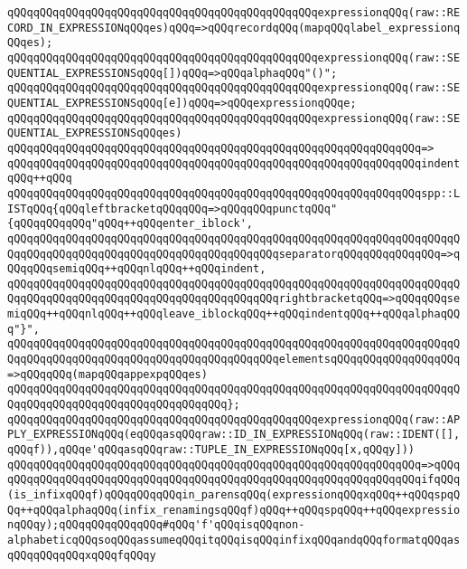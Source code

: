 \verb|qQQqqQQqqQQqqQQqqQQqqQQqqQQqqQQqqQQqqQQqqQQqqQQqexpressionqQQq(raw::RECORD_IN_EXPRESSIONqQQqes)qQQq=>qQQqrecordqQQq(mapqQQqlabel_expressionqQQqes);|\newline
\verb|qQQqqQQqqQQqqQQqqQQqqQQqqQQqqQQqqQQqqQQqqQQqqQQqexpressionqQQq(raw::SEQUENTIAL_EXPRESSIONSqQQq[])qQQq=>qQQqalphaqQQq"()";|\newline
\verb|qQQqqQQqqQQqqQQqqQQqqQQqqQQqqQQqqQQqqQQqqQQqqQQqexpressionqQQq(raw::SEQUENTIAL_EXPRESSIONSqQQq[e])qQQq=>qQQqexpressionqQQqe;|\newline
\newline
\verb|qQQqqQQqqQQqqQQqqQQqqQQqqQQqqQQqqQQqqQQqqQQqqQQqexpressionqQQq(raw::SEQUENTIAL_EXPRESSIONSqQQqes)|\newline
\verb|qQQqqQQqqQQqqQQqqQQqqQQqqQQqqQQqqQQqqQQqqQQqqQQqqQQqqQQqqQQqqQQq=>|\newline
\verb|qQQqqQQqqQQqqQQqqQQqqQQqqQQqqQQqqQQqqQQqqQQqqQQqqQQqqQQqqQQqqQQqindentqQQq++qQQq|\newline
\verb|qQQqqQQqqQQqqQQqqQQqqQQqqQQqqQQqqQQqqQQqqQQqqQQqqQQqqQQqqQQqqQQqspp::LISTqQQq{qQQqleftbracketqQQqqQQq=>qQQqqQQqpunctqQQq"{qQQqqQQqqQQq"qQQq++qQQqenter_iblock',|\newline
\verb|qQQqqQQqqQQqqQQqqQQqqQQqqQQqqQQqqQQqqQQqqQQqqQQqqQQqqQQqqQQqqQQqqQQqqQQqqQQqqQQqqQQqqQQqqQQqqQQqqQQqqQQqqQQqqQQqseparatorqQQqqQQqqQQqqQQq=>qQQqqQQqsemiqQQq++qQQqnlqQQq++qQQqindent,|\newline
\verb|qQQqqQQqqQQqqQQqqQQqqQQqqQQqqQQqqQQqqQQqqQQqqQQqqQQqqQQqqQQqqQQqqQQqqQQqqQQqqQQqqQQqqQQqqQQqqQQqqQQqqQQqqQQqqQQqrightbracketqQQq=>qQQqqQQqsemiqQQq++qQQqnlqQQq++qQQqleave_iblockqQQq++qQQqindentqQQq++qQQqalphaqQQq"}",|\newline
\verb|qQQqqQQqqQQqqQQqqQQqqQQqqQQqqQQqqQQqqQQqqQQqqQQqqQQqqQQqqQQqqQQqqQQqqQQqqQQqqQQqqQQqqQQqqQQqqQQqqQQqqQQqqQQqqQQqelementsqQQqqQQqqQQqqQQqqQQq=>qQQqqQQq(mapqQQqappexpqQQqes)|\newline
\verb|qQQqqQQqqQQqqQQqqQQqqQQqqQQqqQQqqQQqqQQqqQQqqQQqqQQqqQQqqQQqqQQqqQQqqQQqqQQqqQQqqQQqqQQqqQQqqQQqqQQqqQQq};|\newline
\newline
\verb|qQQqqQQqqQQqqQQqqQQqqQQqqQQqqQQqqQQqqQQqqQQqqQQqexpressionqQQq(raw::APPLY_EXPRESSIONqQQq(eqQQqasqQQqraw::ID_IN_EXPRESSIONqQQq(raw::IDENT([],qQQqf)),qQQqe'qQQqasqQQqraw::TUPLE_IN_EXPRESSIONqQQq[x,qQQqy]))|\newline
\verb|qQQqqQQqqQQqqQQqqQQqqQQqqQQqqQQqqQQqqQQqqQQqqQQqqQQqqQQqqQQqqQQq=>qQQq|\newline
\verb|qQQqqQQqqQQqqQQqqQQqqQQqqQQqqQQqqQQqqQQqqQQqqQQqqQQqqQQqqQQqqQQqifqQQq(is_infixqQQqf)qQQqqQQqqQQqin_parensqQQq(expressionqQQqxqQQq++qQQqspqQQq++qQQqalphaqQQq(infix_renamingsqQQqf)qQQq++qQQqspqQQq++qQQqexpressionqQQqy);qQQqqQQqqQQqqQQq#qQQq'f'qQQqisqQQqnon-alphabeticqQQqsoqQQqassumeqQQqitqQQqisqQQqinfixqQQqandqQQqformatqQQqasqQQqqQQqqQQqxqQQqfqQQqy|\newline
